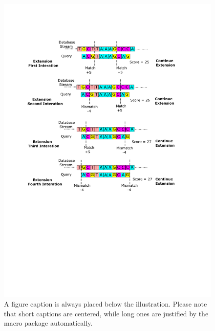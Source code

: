 \begin{figure}
\includegraphics[width=\textwidth]{Figures/Algorithm3.pdf}
\caption{A figure caption is always placed below the illustration.
Please note that short captions are centered, while long ones are
justified by the macro package automatically.} \label{fig4}
\end{figure}